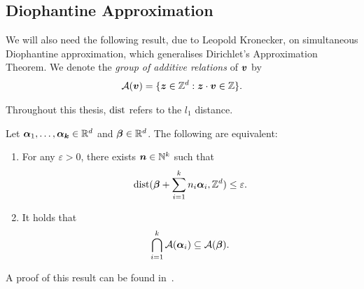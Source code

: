 \subsection{Diophantine Approximation}

We will also need the following result, due to Leopold Kronecker, on simultaneous Diophantine approximation, which generalises Dirichlet's Approximation Theorem. We denote the \emph{group of additive relations} of $\boldsymbol{v}$ by
\begin{align*}
{\cal{A}}(\boldsymbol{v}) = \lbrace \boldsymbol{z} \in \mathbb{Z}^{d} : \boldsymbol{z} \cdot \boldsymbol{v} \in \mathbb{Z} \rbrace .
\end{align*}

Throughout this thesis, $\operatorname{dist}$ refers to the $l_{1}$ distance.

\begin{theorem}[Kronecker]
\label{thm:Kronecker}
Let $\boldsymbol{\alpha}_{1}, \ldots, \boldsymbol{\alpha_{k}} \in \mathbb{R}^{d}$ and $\boldsymbol{\beta} \in \mathbb{R}^{d}$. The following are equivalent:
\begin{enumerate}
\item For any $\varepsilon > 0$, there exists $\boldsymbol{n} \in \mathbb{N}^{k}$ such that
\begin{align*}
\operatorname{dist}(\boldsymbol{\beta} + \sum\limits_{i=1}^{k} n_{i} \boldsymbol{\alpha}_{i}, \mathbb{Z}^{d}) \leq \varepsilon .
\end{align*}
\item It holds that
\begin{align*}
\bigcap\limits_{i=1}^{k} {\cal{A}}(\boldsymbol{\alpha}_{i}) \subseteq {\cal{A}}(\boldsymbol{\beta}) .
\end{align*}
\end{enumerate}
\end{theorem}

A proof of this result can be found in~\cite{Cassels}.
